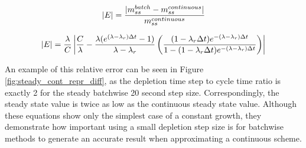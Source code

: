 \begin{equation} \hfill 
|E| = \frac{|m_{ss}^{batch} - m_{ss}^{continuous}|}{m_{ss}^{continuous}}
\hfill\label{eq:ss-err-1} \end{equation}



\begin{equation} \hfill 
|E| = \frac{\lambda}{C} \left| \frac{C}{\lambda}  - \frac{\lambda (e^{(\lambda - \lambda_r) \Delta t} - 1)}{\lambda - \lambda_r}  \left( \frac{(1 - \lambda_r \Delta t) e^{-(\lambda - \lambda_r) \Delta t}}{1 - (1 - \lambda_r \Delta t) e^{-(\lambda - \lambda_r) \Delta t}} \right) \right|
\hfill\label{eq:ss-err-4} \end{equation}

An example of this relative error can be seen in Figure \ref{fig:steady_cont_repr_diff}, as the depletion time step to cycle time ratio is exactly 2 for the steady batchwise 20 second step size. Correspondingly, the steady state value is twice as low as the continuous steady state value. Although these equations show only the simplest case of a constant growth, they demonstrate how important using a small depletion step size is for batchwise methods to generate an accurate result when approximating a continuous scheme.

